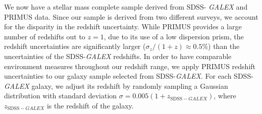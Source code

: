 \documentclass{aastex}
\begin{document}
We now have a stellar mass complete sample derived from SDSS-{\em
  GALEX} and PRIMUS data. Since our sample is derived from two
different surveys, we account for the disparity in the redshift
uncertainty. While PRIMUS provides a large number of redshifts out to
$z = 1$, due to its use of a low dispersion prism, the redshift
uncertainties are significantly larger ($\sigma_{z}/(1+z) \approx 0.5
\%$) than the uncertainties of the SDSS-{\em GALEX} redshifts. In order to have
comparable environment measures throughout our redshift range, we
apply PRIMUS redshift uncertainties to our galaxy sample selected from
SDSS-{\em GALEX}. For each SDSS-{\em GALEX} galaxy, we adjust its
redshift by randomly sampling a Gaussian distribution with standard
deviation $\sigma = 0.005 (1+z_{\mathrm{SDSS}-GALEX})$, where
$z_{\mathrm{SDSS}-GALEX}$ is the redshift of the galaxy.

\end{document}
